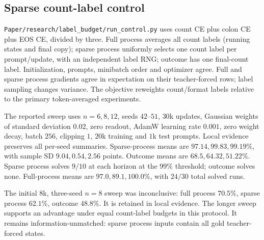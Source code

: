 \subsection{Sparse count-label control}\label{app:label-budget}
\texttt{Paper/research/label\_budget/run\_control.py} uses count CE plus colon CE plus EOS CE, divided by three. Full process averages all count labels (running states and final copy); sparse process uniformly selects one count label per prompt/update, with an independent label RNG; outcome has one final-count label. Initialization, prompts, minibatch order and optimizer agree. Full and sparse process gradients agree in expectation on their teacher-forced rows; label sampling changes variance. The objective reweights count/format labels relative to the primary token-averaged experiments.

The reported sweep uses $n=6,8,12$, seeds $42$--$51$, $30$k updates, Gaussian weights of standard deviation $0.02$, zero readout, AdamW learning rate $0.001$, zero weight decay, batch $256$, clipping $1$, $20$k training and $1$k test prompts. Local evidence preserves all per-seed summaries. Sparse-process means are $97.14,99.83,99.19\%$, with sample SD $9.04,0.54,2.56$ points. Outcome means are $68.5,64.32,51.22\%$. Sparse process solves $9/10$ at each horizon at the $99\%$ threshold; outcome solves none. Full-process means are $97.0,89.1,100.0\%$, with $24/30$ total solved runs.

The initial $8$k, three-seed $n=8$ sweep was inconclusive: full process $70.5\%$, sparse process $62.1\%$, outcome $48.8\%$. It is retained in local evidence. The longer sweep supports an advantage under equal count-label budgets in this protocol. It remains information-unmatched: sparse process inputs contain all gold teacher-forced states.
